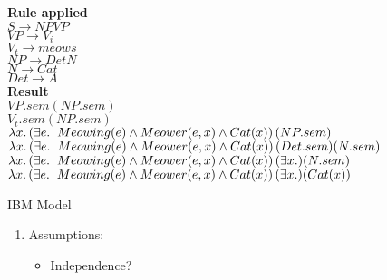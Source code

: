 \documentclass[12pt]{article}
\newcommand{\lp}{\left(}
\newcommand{\rp}{\right)}
\newenvironment{exercise}[2][Exercise]{\begin{trivlist}
\item[\hskip \labelsep {\bfseries #1}\hskip \labelsep {\bfseries #2.}]}{\end{trivlist}}
\begin{document}
\begin{exercise}{5}
\begin{enumerate}[label=(\alph*)]
\begin{vwcol}[widths={0.25,1.2}]
\textbf{Rule applied} \\
$S \rightarrow NP VP$\\
$VP \rightarrow V_i$\\  
$V_t \rightarrow meows$ \\ 
$NP \rightarrow Det N$ \\ 
$N \rightarrow  Cat$ \\ 
$Det \rightarrow A$ \\ 
\textbf{Result} \\
$VP.sem(NP.sem)$ \\
$V_t.sem(NP.sem)$ \\
$\lambda x. \lp \exists e. \hspace{0.2cm} Meowing(e) \land Meower(e,x) \land Cat(x)\rp (NP.sem)$ \\
$\lambda x. \lp \exists e. \hspace{0.2cm} Meowing(e) \land Meower(e,x) \land Cat(x)\rp (Det.sem)(N.sem)$ \\
$\lambda x. \lp \exists e. \hspace{0.2cm} Meowing(e) \land Meower(e,x) \land Cat(x)\rp (\exists x.)(N.sem)$ \\
$\lambda x. \lp \exists e. \hspace{0.2cm} Meowing(e) \land Meower(e,x) \land Cat(x)\rp (\exists x.)(Cat(x))$ \\
\end{vwcol}

\end{enumerate}
\end{exercise} 

\begin{exercise}{6} IBM Model
\begin{enumerate}[label=(\alph*)]

 \item Assumptions:
 
 \begin{itemize}
 \item Independence?
 \end{itemize}
 
\end{enumerate}
\end{exercise}
 

 
 
 
\end{document}
